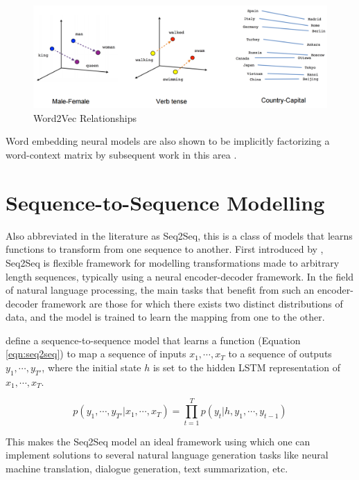\begin{figure}[ht]
	\centering
	\includegraphics[width=\textwidth]{images/word2vec-linear-relationships}
	\caption{\label{fig:word2vec-linear-relationships} Word2Vec Relationships}
\end{figure}

Word embedding neural models are also shown to be implicitly factorizing a word-context matrix by subsequent work in this area \citep{levy2014neural}.


\section{Sequence-to-Sequence Modelling}

Also abbreviated in the literature as Seq2Seq, this is a class of models that learns functions to transform from one sequence to another. First introduced by \cite{sutskever2014sequence}, Seq2Seq is flexible framework for modelling transformations made to arbitrary length sequences, typically using a neural encoder-decoder framework. In the field of natural language processing, the main tasks that benefit from such an encoder-decoder framework are those for which there exists two distinct distributions of data, and the model is trained to learn the mapping from one to the other.

\cite{sutskever2014sequence} define a sequence-to-sequence model that learns a function (Equation \ref{eqn:seq2seq}) to map a sequence of inputs $x_1, \cdots , x_T$ to a sequence of outputs $y_1, \cdots , y_{T'}$, where the initial state $h$ is set to the hidden LSTM representation of $x_1, \cdots , x_T$.

\begin{equation} \label{eqn:seq2seq}
	p(y_1, \cdots , y_{T'} | x_1, \cdots , x_T) =	\prod_{t=1}^T p(y_t | h, y_1, \cdots , y_{t-1})
\end{equation}

This makes the Seq2Seq model an ideal framework using which one can implement solutions to several natural language generation tasks like neural machine translation, dialogue generation, text summarization, etc.

